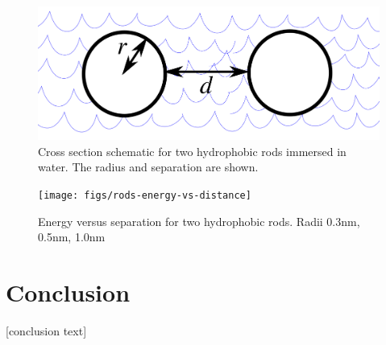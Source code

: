 \documentclass[letterpaper,twocolumn,amsmath,amssymb,prb]{revtex4-1}
\begin{document}
\begin{figure}
\begin{center}
\includegraphics[width=\columnwidth]{figs/rods-diagram}
\end{center}
\caption{ Cross section schematic for two hydrophobic rods immersed in water.
The radius and separation are shown.}
\label{fig:rods}
\end{figure}

\begin{figure}
\begin{center}
\texttt{[image: figs/rods-energy-vs-distance]}
\end{center}
\caption{ Energy versus separation for two hydrophobic rods. Radii 0.3nm, 0.5nm, 1.0nm
 }
\label{fig:rods-energy-vs-distance}
\end{figure}


\section{Conclusion}

[conclusion text]


\end{document}
